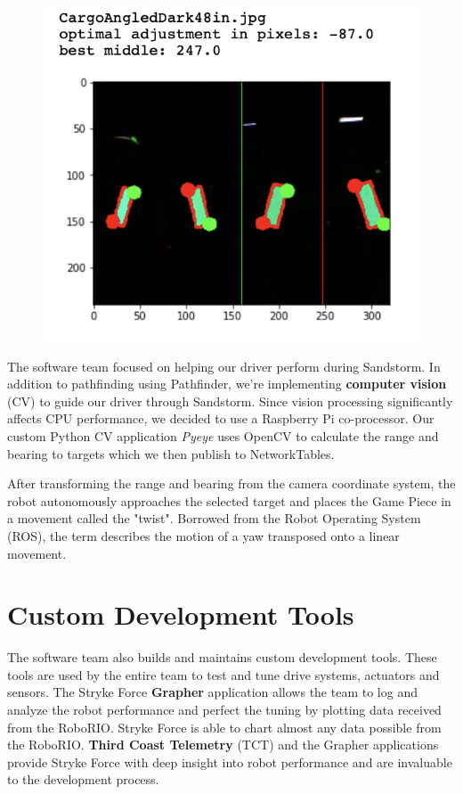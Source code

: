 \documentclass[10pt,tumble]{leaflet}
\begin{document}
\begin{figure}[H]
	\centering
	\includegraphics[scale=0.75]{assets/vision}
\end{figure}

The software team focused on helping our driver perform during Sandstorm. In addition to pathfinding using Pathfinder, we're implementing \textbf{computer vision} (CV) to guide our driver through Sandstorm. Since vision processing significantly affects CPU performance, we decided to use a Raspberry Pi co-processor. Our custom Python CV application \textit{Pyeye} uses OpenCV to calculate the range and bearing to targets which we then publish to NetworkTables.

After transforming the range and bearing from the camera coordinate system, the robot autonomously approaches the selected target and places the Game Piece in a movement called the "twist". Borrowed from the Robot Operating System (ROS), the term describes the motion of a yaw transposed onto a linear movement.

\section{Custom Development Tools}

The software team also builds and maintains custom development tools.  These tools are used by the entire team to test and tune drive systems, actuators and sensors. The Stryke Force \textbf{Grapher} application allows the team to log and analyze the robot performance and perfect the tuning by plotting data received from the RoboRIO.  Stryke Force is able to chart almost any data possible from the RoboRIO.  \textbf{Third Coast Telemetry} (TCT) and the Grapher applications provide Stryke Force with deep insight into robot performance and are invaluable to the development process.
\end{document}

